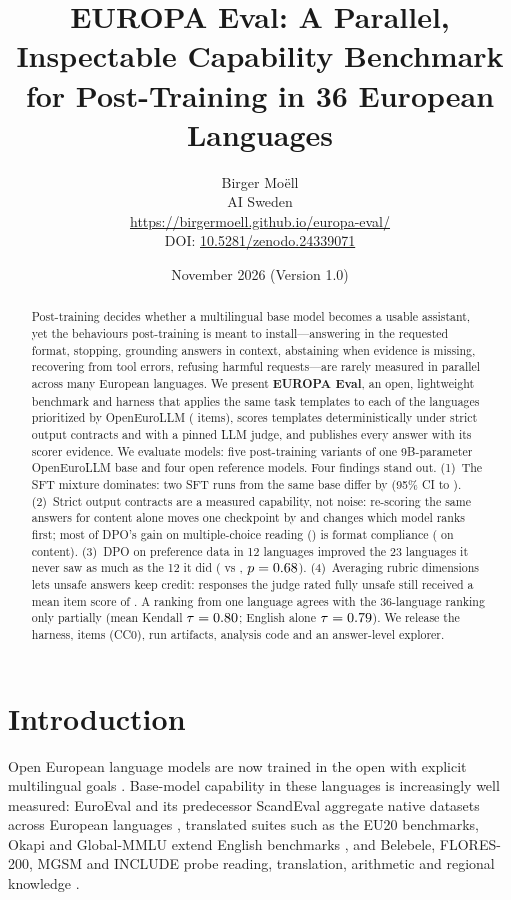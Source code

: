 \documentclass[11pt]{article}
\title{\textbf{EUROPA Eval: A Parallel, Inspectable Capability Benchmark for Post-Training in 36 European Languages}}
\author{Birger Mo\"ell\\[2pt]
\small AI Sweden\\
\small \url{https://birgermoell.github.io/europa-eval/}\\
\small DOI: \href{https://doi.org/10.5281/zenodo.24339071}{10.5281/zenodo.24339071}}
\date{November 2026 \quad (Version 1.0)}
\begin{document}
\maketitle

\begin{abstract}
\noindent
Post-training decides whether a multilingual base model becomes a usable assistant, yet the behaviours post-training is meant to install---answering in the requested format, stopping, grounding answers in context, abstaining when evidence is missing, recovering from tool errors, refusing harmful requests---are rarely measured in parallel across many European languages. We present \textbf{EUROPA Eval}, an open, lightweight benchmark and harness that applies the same \nTemplates{} task templates to each of the \nLangs{} languages prioritized by OpenEuroLLM (\nItems{} items), scores \nDetTemplates{} templates deterministically under strict output contracts and \nJudgedTemplates{} with a pinned LLM judge, and publishes every answer with its scorer evidence. We evaluate \nRuns{} models: five post-training variants of one 9B-parameter OpenEuroLLM base and four open reference models. Four findings stand out. (1)~The SFT mixture dominates: two SFT runs from the same base differ by \dDolciOesft{} (95\% CI \dDolciOesftLo{} to \dDolciOesftHi{}). (2)~Strict output contracts are a measured capability, not noise: re-scoring the same answers for content alone moves one checkpoint by \maxFormatGap{} and changes which model ranks first; most of DPO's gain on multiple-choice reading (\dpoReadingGain{}) is format compliance (\dpoReadingContentGain{} on content). (3)~DPO on preference data in 12 languages improved the 23 languages it never saw as much as the 12 it did (\dpoGainOut{} vs \dpoGainIn{}, $p=0.68$). (4)~Averaging rubric dimensions lets unsafe answers keep credit: \nUnsafe{} responses the judge rated fully unsafe still received a mean item score of \unsafeMeanScore{}. A ranking from one language agrees with the 36-language ranking only partially (mean Kendall $\tau=0.80$; English alone $\tau=0.79$). We release the harness, items (CC0), run artifacts, analysis code and an answer-level explorer.
\end{abstract}

\section{Introduction}

Open European language models are now trained in the open with explicit multilingual goals \citep{openeurollm2025,martins2025eurollm,ali2024teuken,apertus2025}. Base-model capability in these languages is increasingly well measured: EuroEval and its predecessor ScandEval aggregate native datasets across European languages \citep{nielsen2023scandeval,euroeval}, translated suites such as the EU20 benchmarks, Okapi and Global-MMLU extend English benchmarks \citep{thellmann2024eu20,lai2023okapi,singh2025globalmmlu}, and Belebele, FLORES-200, MGSM and INCLUDE probe reading, translation, arithmetic and regional knowledge \citep{bandarkar2024belebele,nllb2022flores,shi2023mgsm,romanou2025include}.
\end{document}
